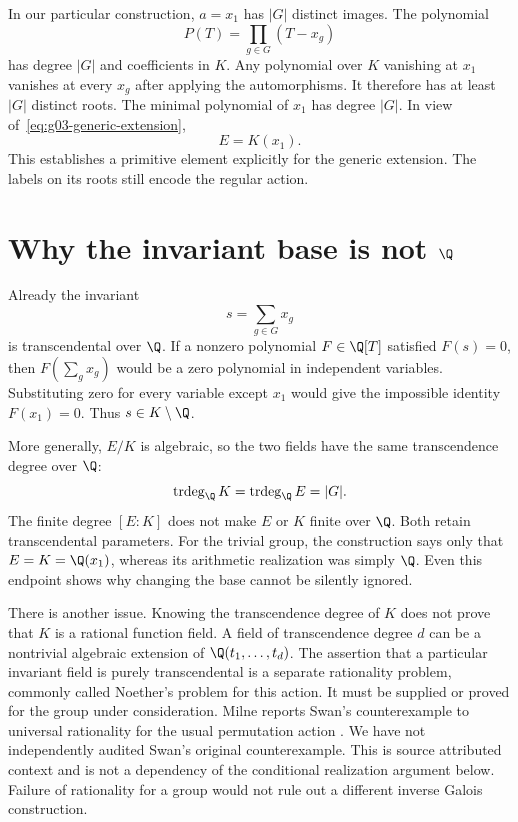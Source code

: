 In our particular construction, $a=x_1$ has $|G|$ distinct images. The polynomial
\begin{equation}
\label{eq:g03-orbit-polynomial}
P(T)=\prod_{g\in G}(T-x_g)
\end{equation}
has degree $|G|$ and coefficients in $K$. Any polynomial over $K$ vanishing at $x_1$ vanishes at every $x_g$ after applying the automorphisms. It therefore has at least $|G|$ distinct roots. The minimal polynomial of $x_1$ has degree $|G|$. In view of~\eqref{eq:g03-generic-extension},
\[
E=K(x_1).
\]
This establishes a primitive element explicitly for the generic extension. The labels on its roots still encode the regular action.

\section{Why the invariant base is not $\Q$}

Already the invariant
\[
s=\sum_{g\in G}x_g
\]
is transcendental over $\Q$. If a nonzero polynomial $F\in\Q[T]$ satisfied $F(s)=0$, then $F(\sum_gx_g)$ would be a zero polynomial in independent variables. Substituting zero for every variable except $x_1$ would give the impossible identity $F(x_1)=0$. Thus $s\in K\setminus\Q$.

More generally, $E/K$ is algebraic, so the two fields have the same transcendence degree over $\Q$:
\begin{equation}
\label{eq:g03-transdegree}
\operatorname{trdeg}_{\Q}K=\operatorname{trdeg}_{\Q}E=|G|.
\end{equation}
The finite degree $[E:K]$ does not make $E$ or $K$ finite over $\Q$. Both retain transcendental parameters. For the trivial group, the construction says only that $E=K=\Q(x_1)$, whereas its arithmetic realization was simply $\Q$. Even this endpoint shows why changing the base cannot be silently ignored.

There is another issue. Knowing the transcendence degree of $K$ does not prove that $K$ is a rational function field. A field of transcendence degree $d$ can be a nontrivial algebraic extension of $\Q(t_1,\ldots,t_d)$. The assertion that a particular invariant field is purely transcendental is a separate rationality problem, commonly called Noether's problem for this action. It must be supplied or proved for the group under consideration. Milne reports Swan's counterexample to universal rationality for the usual permutation action \cite[Aside 5.41]{Milne2022}. We have not independently audited Swan's original counterexample. This is source attributed context and is not a dependency of the conditional realization argument below. Failure of rationality for a group would not rule out a different inverse Galois construction.


